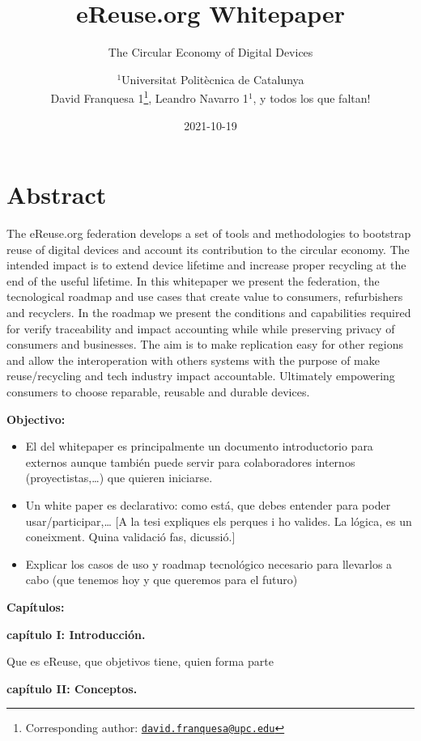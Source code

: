 \documentclass[
]{book}
\title{eReuse.org Whitepaper}
\subtitle{The Circular Economy of Digital Devices}
\author{\(^1\)Universitat Politècnica de Catalunya\\
David Franquesa 1\footnote{Corresponding author: \href{mailto:david.franquesa@upc.edu}{\nolinkurl{david.franquesa@upc.edu}}}, Leandro Navarro 1\(^1\), y todos los que faltan!}
\date{2021-10-19}
\begin{document}
\maketitle

{
\setcounter{tocdepth}{1}
\tableofcontents
}
\hypertarget{abstract}{%
\chapter*{Abstract}\label{abstract}}

The eReuse.org federation develops a set of tools and methodologies to bootstrap reuse of digital devices and account its contribution to the circular economy. The intended impact is to extend device lifetime and increase proper recycling at the end of the useful lifetime. In this whitepaper we present the federation, the tecnological roadmap and use cases that create value to consumers, refurbishers and recyclers. In the roadmap we present the conditions and capabilities required for verify traceability and impact accounting while while preserving privacy of consumers and businesses. The aim is to make replication easy for other regions and allow the interoperation with others systems with the purpose of make reuse/recycling and tech industry impact accountable. Ultimately empowering consumers to choose reparable, reusable and durable devices.

\textbf{Objectivo: }

\begin{itemize}
\item
  El del whitepaper es principalmente un documento introductorio para externos aunque también puede servir para colaboradores internos (proyectistas,\ldots) que quieren iniciarse.
\item
  Un white paper es declarativo: como está, que debes entender para poder usar/participar,\ldots{} {[}A la tesi expliques els perques i ho valides. La lógica, es un coneixment. Quina validació fas, dicussió.{]}
\item
  Explicar los casos de uso y roadmap tecnológico necesario para llevarlos a cabo (que tenemos hoy y que queremos para el futuro)
\end{itemize}

\textbf{Capítulos:}

\textbf{capítulo I: Introducción.}

Que es eReuse, que objetivos tiene, quien forma parte

\textbf{capítulo II: Conceptos.}
\end{document}

